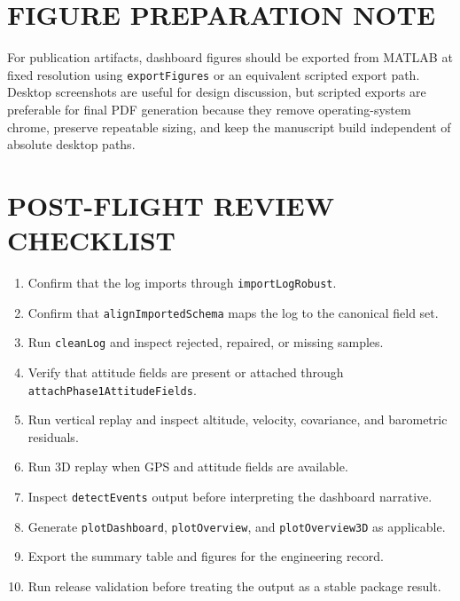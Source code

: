 \documentclass[colorlinks,upint,subscriptcorrection,varvw,hyphenate,balance]{asmeconf}
\newcommand{\code}[1]{\texttt{\allowbreak#1}}
\begin{document}
\section{FIGURE PREPARATION NOTE}

For publication artifacts, dashboard figures should be exported from MATLAB at fixed resolution using \code{exportFigures} or an equivalent scripted export path. Desktop screenshots are useful for design discussion, but scripted exports are preferable for final PDF generation because they remove operating-system chrome, preserve repeatable sizing, and keep the manuscript build independent of absolute desktop paths.

\section{POST-FLIGHT REVIEW CHECKLIST}

\begin{enumerate}[leftmargin=*,nosep]
\item Confirm that the log imports through \code{importLogRobust}.
\item Confirm that \code{alignImportedSchema} maps the log to the canonical field set.
\item Run \code{cleanLog} and inspect rejected, repaired, or missing samples.
\item Verify that attitude fields are present or attached through \code{attachPhase1AttitudeFields}.
\item Run vertical replay and inspect altitude, velocity, covariance, and barometric residuals.
\item Run 3D replay when GPS and attitude fields are available.
\item Inspect \code{detectEvents} output before interpreting the dashboard narrative.
\item Generate \code{plotDashboard}, \code{plotOverview}, and \code{plotOverview3D} as applicable.
\item Export the summary table and figures for the engineering record.
\item Run release validation before treating the output as a stable package result.
\end{enumerate}
\end{document}
